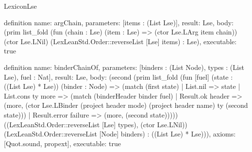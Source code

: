\begin{lexlean}{LexiconLse}
\begin{semanticmodule}
definition{
  name: argChain,
  parameters: [items : (List Lse)],
  result: Lse,
  body: (prim list_fold (fun (chain : Lse) (item : Lse) => (ctor Lse.LArg item chain)) (ctor Lse.LNil) (LexLeanStd.Order::reverseList [Lse] items) : Lse),
  executable: true
}

definition{
  name: binderChainOf,
  parameters: [binders : (List Node), types : (List Lse), fuel : Nat],
  result: Lse,
  body: (second (prim list_fold (fun [fuel] (state : ((List Lse) * Lse)) (binder : Node) => (match (first state)
    | List.nil => state
    | List.cons ty more => (match (binderHeader binder fuel)
      | Result.ok header => (more, (ctor Lse.LBinder (project header mode) (project header name) ty (second state)))
      | Result.error failure => (more, (second state))))) ((LexLeanStd.Order::reverseList [Lse] types), (ctor Lse.LNil)) (LexLeanStd.Order::reverseList [Node] binders) : ((List Lse) * Lse))),
  axioms: [Quot.sound, propext],
  executable: true
}


\end{semanticmodule}
\end{lexlean}
